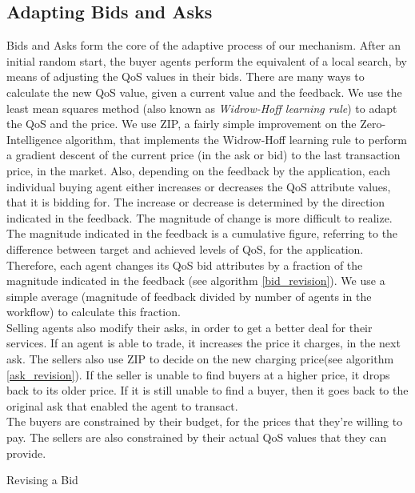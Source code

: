 \documentclass[10pt,journal,compsoc]{IEEEtran}
\begin{document}
\subsection{Adapting Bids and Asks}
Bids and Asks form the core of the adaptive process of our mechanism. After an initial random start, the buyer agents perform the equivalent of a local search, by means of adjusting the QoS values in their bids. There are many ways to calculate the new QoS value, given a current value and the feedback. We use the least mean squares method (also known as \textit{Widrow-Hoff learning rule})\cite{Haykin2003Least} to adapt the QoS and the price. We use ZIP\cite{Cliff1998Simple}, a fairly simple improvement on the Zero-Intelligence algorithm, that implements the Widrow-Hoff learning rule to perform a gradient descent of the current price (in the ask or bid) to the last transaction price, in the market.  Also, depending on the feedback by the application, each individual buying agent either increases or decreases the QoS attribute values, that it is bidding for. The increase or decrease is determined by the direction indicated in the feedback. The magnitude of change is more difficult to realize. The magnitude indicated in the feedback is a cumulative figure, referring to the difference between target and achieved levels of QoS, for the application. Therefore, each agent changes its QoS bid attributes by a fraction of the magnitude indicated in the feedback (see algorithm \ref{bid_revision}). We use a simple average (magnitude of feedback divided by number of agents in the workflow) to calculate this fraction.\\
Selling agents also modify their asks, in order to get a better deal for their services. If an agent is able to trade, it increases the price it charges, in the next ask. The sellers also use ZIP to decide on the new charging price(see algorithm \ref{ask_revision}). If the seller is unable to find buyers at a higher price, it drops back to its older price. If it is still unable to find a buyer, then it goes back to the original ask that enabled the agent to transact.\\
The buyers are constrained by their budget, for the prices that they're willing to pay. The sellers are also constrained by their actual QoS values that they can provide.
 
 \begin{algorithm}
 \DontPrintSemicolon
  \caption{Revising a Bid}
  \label{bid_revision}   
 \end{algorithm}
\end{document}

